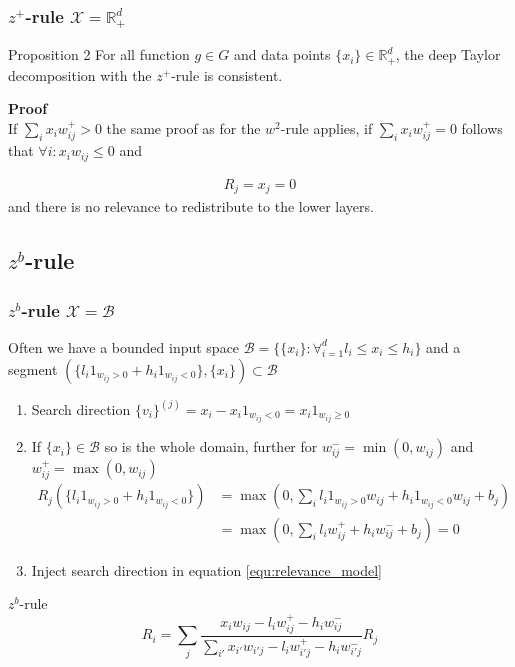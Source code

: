 \documentclass{beamer}
\begin{document}
\begin{frame}
\frametitle{$z^+$-rule $\mathcal{X}=\mathbb{R}^d_+$}
\vspace{-0.4cm}
\begin{block}{Proposition 2}
For all function $g \in G$ and data points $\{x_i\} \in \mathbb{R}_+^d$, the deep Taylor decomposition with the $z^+$-rule is consistent.
\end{block}
\vspace{0.5cm}
\textbf{Proof}\\
If $\sum_i x_i w_{ij}^+ >0$ the same proof as for the $w^2$-rule applies, if $\sum_i x_i w_{ij}^+ =0$ follows that $\forall i: x_i w_{ij} \leq0$ and 

\begin{align*}
 R_j = x_j = 0
\end{align*}
and there is no relevance to redistribute to the lower layers.


\end{frame}






\subsection[$z^b$-rule]{$z^b$-rule}


\begin{frame}
\frametitle{$z^b$-rule $\mathcal{X}=\mathcal{B}$}
\vspace{0.4cm}
Often we have a bounded input space $\mathcal{B} = \{\{x_i\} : \forall_{i=1}^d l_i\leq x_i \leq h_i\} $ and a segment $(\{l_i 1_{w_{ij}>0} + h_i 1_{w_{ij}<0}\},\{x_i\})\subset \mathcal{B}$\\
\begin{enumerate}
	\item Search direction $\{v_i\}^{(j)} = x_i - x_i 1_{w_{ij}<0} = x_i 1_{w_{ij}\geq0}$
	\item If $\{x_i\} \in \mathcal{B}$ so is the whole domain, further for $w_{ij}^-=\min(0,w_{ij})$ and $w_{ij}^+=\max(0,w_{ij})$
	\vspace{-0.25cm}
	\begin{align*}
		R_j(\{l_i 1_{w_{ij}>0} + h_i 1_{w_{ij}<0}\}) &= \max(0, \sum_i l_i 1_{w_{ij}>0} w_{ij} + h_i 1_{w_{ij}<0} w_{ij} + b_j)\\
		&=\max(0, \sum_i l_i w_{ij}^+ + h_i w_{ij}^- + b_j)= 0
	\end{align*}
	\vspace{-0.25cm}
	\item Inject search direction in equation \eqref{equ:relevance_model}
\end{enumerate}
\vspace{-0.25cm}

\begin{block}{$z^b$-rule}
\begin{equation*}
R_i =  \sum_j \frac{x_i w_{ij} - l_i w_{ij}^+ - h_i w_{ij}^-}{\sum_{i'} x_{i'} w_{i'j}  - l_i w_{i'j}^+ - h_i w_{i'j}^-} R_j
\end{equation*}
\end{block}

\end{frame}
\end{document}
